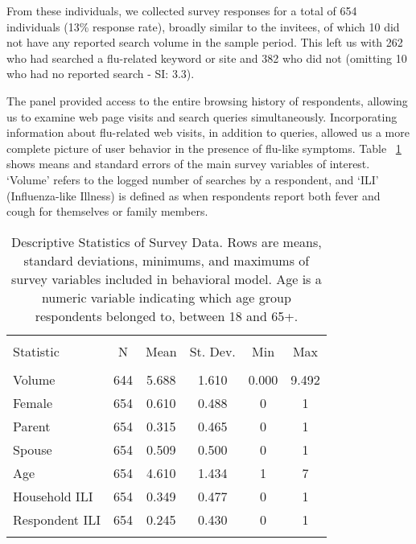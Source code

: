 \documentclass[fleqn,10pt]{wlscirep}
\begin{document}
From these individuals, we collected survey responses for a total of 654 individuals (13\% response rate), broadly similar to the invitees, of which 10 did not have any reported search volume in the sample period. This left us with 262 who had searched a flu-related keyword or site and 382 who did not (omitting 10 who had no reported search - SI: 3.3). 

The panel provided access to the entire browsing history of respondents, allowing us to examine web page visits and search queries simultaneously. Incorporating information about flu-related web visits, in addition to queries, allowed us a more complete picture of user behavior in the presence of flu-like symptoms. Table ~\ref{tab:descriptives} shows means and standard errors of the main survey variables of interest. `Volume' refers to the logged number of searches by a respondent, and `ILI' (Influenza-like Illness) is defined as when respondents report both fever and cough for themselves or family members.

\begin{table}[!htbp] \centering 
\begin{tabular}{@{\extracolsep{5pt}}lccccc} 
\\[-1.8ex]\hline 
\hline \\[-1.8ex] 
Statistic & \multicolumn{1}{c}{N} & \multicolumn{1}{c}{Mean} & \multicolumn{1}{c}{St. Dev.} & \multicolumn{1}{c}{Min} & \multicolumn{1}{c}{Max} \\ 
\hline \\[-1.8ex] 
Volume & 644 & 5.688 & 1.610 & 0.000 & 9.492 \\ 
Female & 654 & 0.610 & 0.488 & 0 & 1 \\ 
Parent & 654 & 0.315 & 0.465 & 0 & 1 \\ 
Spouse & 654 & 0.509 & 0.500 & 0 & 1 \\ 
Age & 654 & 4.610 & 1.434 & 1 & 7 \\ 
Household ILI & 654 & 0.349 & 0.477 & 0 & 1 \\ 
Respondent ILI & 654 & 0.245 & 0.430 & 0 & 1 \\ 
\hline \\[-1.8ex] 
\end{tabular} 
  \caption{Descriptive Statistics of Survey Data. Rows are means, standard deviations, minimums, and maximums of survey variables included in behavioral model. Age is a numeric variable indicating which age group respondents belonged to, between 18 and 65+.} 
\label{tab:descriptives}
\end{table} 
\end{document}
